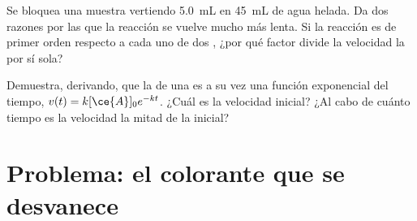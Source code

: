 \begin{exercise}[$\star\star\star$]\label{exo:g12:reaction-rates:14}
Se bloquea una muestra vertiendo \qty{5.0}{mL} en \qty{45}{mL} de agua
helada. Da dos razones por las que la reacción se vuelve mucho más
lenta. Si la reacción es de primer orden respecto a cada uno de dos
, ¿por qué factor divide la velocidad la  por sí sola?
\end{exercise}

\begin{exercise}[$\star\star\star$]\label{exo:g12:reaction-rates:15}
Demuestra, derivando, que la  de una  es a su vez una función exponencial del tiempo,
$v(t) = k[\ce{A}]_0 e^{-kt}$. ¿Cuál es la velocidad inicial? ¿Al cabo de
cuánto tiempo es la velocidad la mitad de la inicial?
\end{exercise}

\section{Problema: el colorante que se desvanece}

